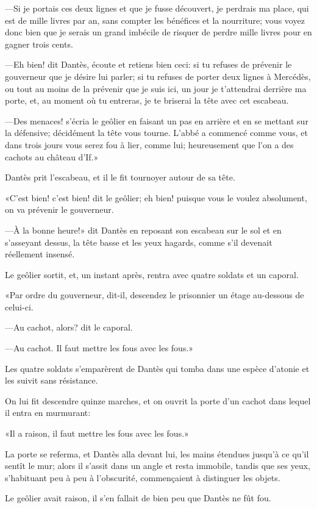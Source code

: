 —Si je portais ces deux lignes et que je fusse découvert, je perdrais ma place, qui est de mille livres par an, sans compter les bénéfices et la nourriture; vous voyez donc bien que je serais un grand imbécile de risquer de perdre mille livres pour en gagner trois cents.

—Eh bien! dit Dantès, écoute et retiens bien ceci: si tu refuses de prévenir le gouverneur que je désire lui parler; si tu refuses de porter deux lignes à Mercédès, ou tout au moins de la prévenir que je suis ici, un jour je t'attendrai derrière ma porte, et, au moment où tu entreras, je te briserai la tête avec cet escabeau.

—Des menaces! s'écria le geôlier en faisant un pas en arrière et en se mettant sur la défensive; décidément la tête vous tourne. L'abbé a commencé comme vous, et dans trois jours vous serez fou à lier, comme lui; heureusement que l'on a des cachots au château d'If.»

Dantès prit l'escabeau, et il le fit tournoyer autour de sa tête.

«C'est bien! c'est bien! dit le geôlier; eh bien! puisque vous le voulez absolument, on va prévenir le gouverneur.

—À la bonne heure!» dit Dantès en reposant son escabeau sur le sol et en s'asseyant dessus, la tête basse et les yeux hagards, comme s'il devenait réellement insensé.

Le geôlier sortit, et, un instant après, rentra avec quatre soldats et un caporal.

«Par ordre du gouverneur, dit-il, descendez le prisonnier un étage au-dessous de celui-ci.

—Au cachot, alors? dit le caporal.

—Au cachot. Il faut mettre les fous avec les fous.»

Les quatre soldats s'emparèrent de Dantès qui tomba dans une espèce d'atonie et les suivit sans résistance.

On lui fit descendre quinze marches, et on ouvrit la porte d'un cachot dans lequel il entra en murmurant:

«Il a raison, il faut mettre les fous avec les fous.»

La porte se referma, et Dantès alla devant lui, les mains étendues jusqu'à ce qu'il sentît le mur; alors il s'assit dans un angle et resta immobile, tandis que ses yeux, s'habituant peu à peu à l'obscurité, commençaient à distinguer les objets.

Le geôlier avait raison, il s'en fallait de bien peu que Dantès ne fût fou.



